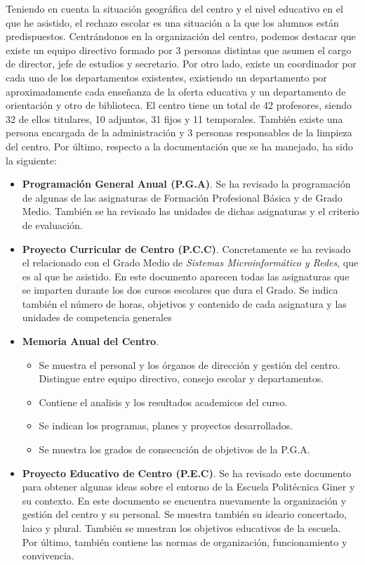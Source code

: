 \documentclass[spanish,12pt, a4paper,twoside]{paper}
\begin{document}
\justify
Teniendo en cuenta la situación geográfica del centro y el nivel educativo en el que he asistido, el rechazo escolar es una situación a la que los alumnos están predispuestos. 
\justify
Centrándonos en la organización del centro, podemos destacar que existe un equipo directivo formado por 3 personas distintas que asumen el cargo de director, jefe de estudios y secretario. Por otro lado, existe un coordinador por cada uno de los departamentos existentes, existiendo un departamento por aproximadamente cada enseñanza de la oferta educativa y un departamento de orientación y otro de biblioteca.
\justify
El centro tiene un total de 42 profesores, siendo 32 de ellos titulares, 10 adjuntos, 31 fijos y 11 temporales. También existe una persona encargada de la administración y 3 personas responsables de la limpieza del centro.
\justify
Por último, respecto a la documentación que se ha manejado, ha sido la siguiente:
\begin{itemize}
\item \textbf{Programación General Anual (P.G.A)}. Se ha revisado la programación de algunas de las asignaturas de Formación Profesional Básica y de Grado Medio. También se ha revisado las unidades de dichas asignaturas y el criterio de evaluación.
\item \textbf{Proyecto Curricular de Centro (P.C.C)}. Concretamente se ha revisado el relacionado con el Grado Medio de \textit{Sistemas Microinformático y Redes}, que es al que he asistido. En este documento aparecen todas las asignaturas que se imparten durante los dos cursos escolares que dura el Grado. Se indica también el número de horas, objetivos y contenido de cada asignatura y las unidades de competencia generales
\item \textbf{Memoria Anual del Centro}. 
\begin{itemize}
\item Se muestra el personal y los órganos de dirección y gestión del centro. Distingue entre equipo directivo, consejo escolar y departamentos.
\item Contiene el analisis y los resultados academicos del curso.
\item Se indican los programas, planes y proyectos desarrollados.
\item Se muestra los grados de consecución de objetivos de la P.G.A.
\end{itemize}
\item \textbf{Proyecto Educativo de Centro (P.E.C)}. Se ha revisado este documento para obtener algunas ideas sobre el entorno de la Escuela Politécnica Giner y su contexto. En este documento se encuentra nuevamente la organización y gestión del centro y su personal. Se muestra también su ideario concertado, laico y plural. También se muestran los objetivos educativos de la escuela. Por último, también contiene las normas de organización, funcionamiento y convivencia.
\end{itemize}
\end{document}
